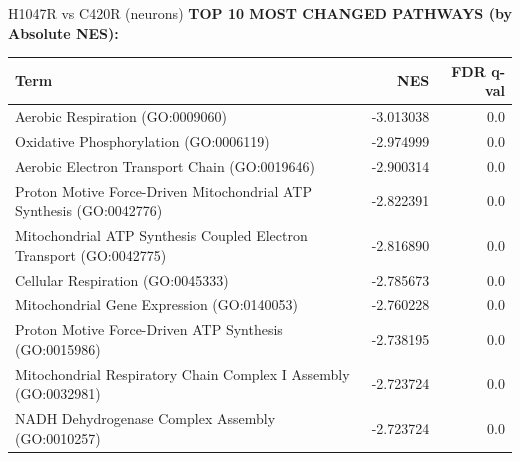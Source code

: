 \documentclass[10pt, aspectratio=169]{beamer}
\begin{document}
\begin{frame}{H1047R vs C420R (neurons)}
  \centering
  {\small \textbf{TOP 10 MOST CHANGED PATHWAYS (by Absolute NES):}}\par
  \vspace{0.15cm}
  \scriptsize
  \begin{tabular}{p{8.5cm} r r}
    \toprule
    \textbf{Term} & \textbf{NES} & \textbf{FDR q-val} \\
    \midrule
    Aerobic Respiration (GO:0009060) & -3.013038 & 0.0 \\
    Oxidative Phosphorylation (GO:0006119) & -2.974999 & 0.0 \\
    Aerobic Electron Transport Chain (GO:0019646) & -2.900314 & 0.0 \\
    Proton Motive Force-Driven Mitochondrial ATP Synthesis (GO:0042776) & -2.822391 & 0.0 \\
    Mitochondrial ATP Synthesis Coupled Electron Transport (GO:0042775) & -2.816890 & 0.0 \\
    Cellular Respiration (GO:0045333) & -2.785673 & 0.0 \\
    Mitochondrial Gene Expression (GO:0140053) & -2.760228 & 0.0 \\
    Proton Motive Force-Driven ATP Synthesis (GO:0015986) & -2.738195 & 0.0 \\
    Mitochondrial Respiratory Chain Complex I Assembly (GO:0032981) & -2.723724 & 0.0 \\
    NADH Dehydrogenase Complex Assembly (GO:0010257) & -2.723724 & 0.0 \\
    \bottomrule
  \end{tabular}
\end{frame}
\end{document}

